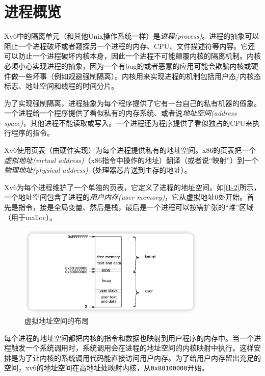\section*{进程概览}
Xv6中的隔离单元（和其他Unix操作系统一样）是\emph{进程(process)}。进程的抽象可以阻止一个进程破坏或者窥探另一个进程的内存、CPU、文件描述符等内容。它还可以防止一个进程破坏内核本身，因此一个进程不可能颠覆内核的隔离机制。内核必须小心实现进程的抽象，因为一个有bug的或者恶意的应用可能会欺骗内核或硬件做一些坏事（例如规避强制隔离）。内核用来实现进程的机制包括用户态/内核态标志、地址空间和线程的时间分片。

为了实现强制隔离，进程抽象为每个程序提供了它有一台自己的私有机器的假象。一个进程给一个程序提供了看似私有的内存系统、或者说\emph{地址空间(address space)}，其他进程不能读取或写入。一个进程还为程序提供了看似独占的CPU来执行程序的指令。

Xv6使用页表（由硬件实现）为每个进程提供私有的地址空间。x86的页表把一个\emph{虚拟地址(virtual address)}（x86指令中操作的地址）翻译（或者说“映射”）到一个\emph{物理地址(physical address)}（处理器芯片送到主存的地址）。

Xv6为每个进程维护了一个单独的页表，它定义了进程的地址空间。如\autoref{f1-2}所示，一个地址空间包含了进程的\emph{用户内存(user memory)}，它从虚拟地址0处开始。首先是指令，接是全局变量、然后是栈，最后是一个进程可以按需扩张的“堆”区域（用于malloc）。

\begin{figure}[htbp]
    \centering
    \includegraphics[width=0.8\textwidth]{../imgs/f1-2.png}
    \caption{虚拟地址空间的布局}
    \label{f1-2}
\end{figure}

每个进程的地址空间都把内核的指令和数据也映射到用户程序的内存中。当一个进程触发一个系统调用时，系统调用会在进程的地址空间的内核映射中执行。这样安排是为了让内核的系统调用代码能直接访问用户内存。为了给用户内存留出充足的空间，xv6的地址空间在高地址处映射内核，从\texttt{0x80100000}开始。

